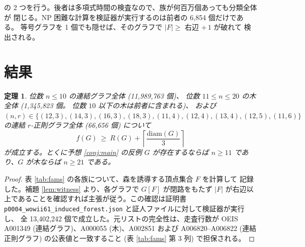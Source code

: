 \documentclass[paper=a4,fontsize=10.5pt,jafontsize=10.5pt]{jlreq}
\theoremstyle{plain}
\newtheorem{theorem}{定理}[section]
\theoremstyle{definition}
\begin{document}
の 2 つを行う。後者は多項式時間の検査なので、族が何百万個あっても分類全体が
閉じる。NP 困難な計算を検証器が実行するのは前者の 6,854 個だけである。
等号グラフを 1 個でも隠せば、そのグラフで $|F| \ge$ 右辺 $+\,1$ が破れて
検出される。

\section{結果}

\begin{theorem}\label{thm:main}
位数 $n \le 10$ の連結グラフ全体 (11,989,763 個)、
位数 $11 \le n \le 20$ の木全体 (1,345,823 個。
位数 $10$ 以下の木は前者に含まれる)、
および $(n, r) \in \{(12, 3), (14, 3), (16, 3), (18, 3), (11, 4), (12, 4), (13, 4), (12, 5), (11, 6)\}$ の連結 $r$-正則グラフ全体
(66,656 個) について
\[ f(G) \ \ge \ R(G) + \left\lceil \frac{\mathrm{diam}(G)}{3} \right\rceil \]
が成立する。とくに予想 \ref{conj:main} の反例 $G$ が存在するならば
$n \ge 11$ であり、$G$ が木ならば $n \ge 21$ である。
\end{theorem}

\begin{proof}
表 \ref{tab:fams} の各族について、森を誘導する頂点集合 $F$ を計算して
記録した。補題 \ref{lem:witness} より、各グラフで $G[F]$ が閉路をもたず
$|F|$ が右辺以上であることを確認すれば主張が従う。この確認は証明書
\texttt{p0004\_wowii61\_induced\_forest.json} と証人ファイルに対して検証器が実行し、
全 13,402,242 個で成立した。元リストの完全性は、走査行数が
OEIS A001349 (連結グラフ)、A000055 (木)、A002851 および
A006820--A006822 (連結正則グラフ) の公表値と一致すること
(表 \ref{tab:fams} 第 3 列) で担保される。
\end{proof}
\end{document}
